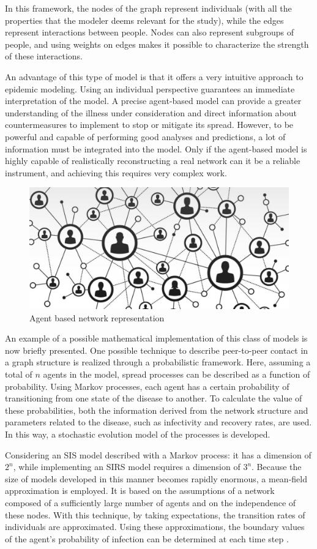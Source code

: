 In this framework, the nodes of the graph represent individuals (with all the properties that the modeler deems relevant for the study), while the edges represent interactions between people. Nodes can also represent subgroups of people, and using weights on edges makes it possible to characterize the strength of these interactions.

An advantage of this type of model is that it offers a very intuitive approach to epidemic modeling. Using an individual perspective guarantees an immediate interpretation of the model. A precise agent-based model can provide a greater understanding of the illness under consideration and direct information about countermeasures to implement to stop or mitigate its spread. However, to be powerful and capable of performing good analyses and predictions, a lot of information must be integrated into the model. Only if the agent-based model is highly capable of realistically reconstructing a real network can it be a reliable instrument, and achieving this requires very complex work.
\begin{figure}
	\centering
	\includegraphics[width=0.5\linewidth]{0_introduction/images_introduction/agent_based}
	\caption[Agent based network representation]{Agent based network representation}
	\label{fig:agentbased}
\end{figure}


An example of a possible mathematical implementation of this class of models is now briefly presented. One possible technique to describe peer-to-peer contact in a graph structure is realized through a probabilistic framework. Here, assuming a total of $n$ agents in the model, spread processes can be described as a function of probability. Using Markov processes, each agent has a certain probability of transitioning from one state of the disease to another. To calculate the value of these probabilities, both the information derived from the network structure and parameters related to the disease, such as infectivity and recovery rates, are used. In this way, a stochastic evolution model of the processes is developed.

Considering an SIS model described with a Markov process: it has a dimension of $2^n$, while implementing an SIRS model requires a dimension of $3^n$. Because the size of models developed in this manner becomes rapidly enormous, a mean-field approximation is employed. It is based on the assumptions of a network composed of a sufficiently large number of agents and on the independence of these nodes. With this technique, by taking expectations, the transition rates of individuals are approximated. Using these approximations, the boundary values of the agent's probability of infection can be determined at each time step \cite{Hernandez_Vargas_2022}.

